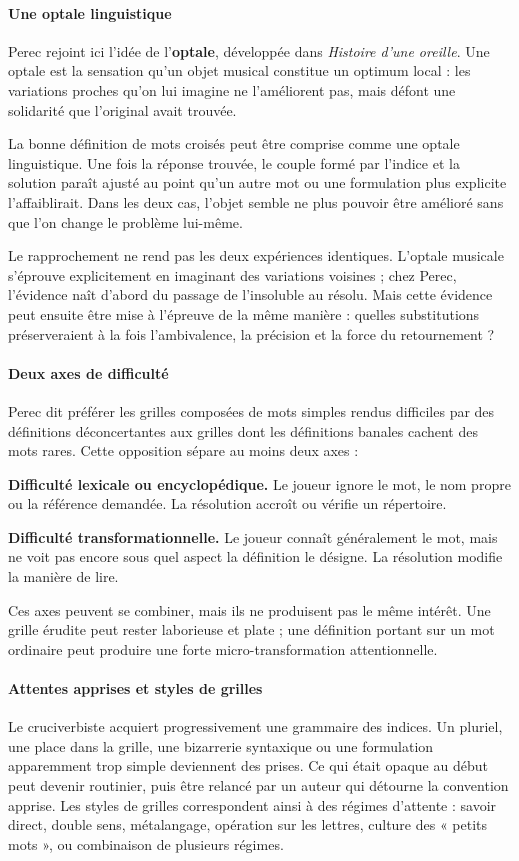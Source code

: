 \documentclass[10pt,a4paper]{article}
\begin{document}
\paragraph{Une optale linguistique}
Perec rejoint ici l'idée de l'\textbf{optale}, développée dans \emph{Histoire d'une oreille}. Une optale est la sensation qu'un objet musical constitue un optimum local : les variations proches qu'on lui imagine ne l'améliorent pas, mais défont une solidarité que l'original avait trouvée.

La bonne définition de mots croisés peut être comprise comme une optale linguistique. Une fois la réponse trouvée, le couple formé par l'indice et la solution paraît ajusté au point qu'un autre mot ou une formulation plus explicite l'affaiblirait. Dans les deux cas, l'objet semble ne plus pouvoir être amélioré sans que l'on change le problème lui-même.

Le rapprochement ne rend pas les deux expériences identiques. L'optale musicale s'éprouve explicitement en imaginant des variations voisines ; chez Perec, l'évidence naît d'abord du passage de l'insoluble au résolu. Mais cette évidence peut ensuite être mise à l'épreuve de la même manière : quelles substitutions préserveraient à la fois l'ambivalence, la précision et la force du retournement ?

\paragraph{Deux axes de difficulté}
Perec dit préférer les grilles composées de mots simples rendus difficiles par des définitions déconcertantes aux grilles dont les définitions banales cachent des mots rares. Cette opposition sépare au moins deux axes :

\textbf{Difficulté lexicale ou encyclopédique.} Le joueur ignore le mot, le nom propre ou la référence demandée. La résolution accroît ou vérifie un répertoire.

\textbf{Difficulté transformationnelle.} Le joueur connaît généralement le mot, mais ne voit pas encore sous quel aspect la définition le désigne. La résolution modifie la manière de lire.

Ces axes peuvent se combiner, mais ils ne produisent pas le même intérêt. Une grille érudite peut rester laborieuse et plate ; une définition portant sur un mot ordinaire peut produire une forte micro-transformation attentionnelle.

\paragraph{Attentes apprises et styles de grilles}
Le cruciverbiste acquiert progressivement une grammaire des indices. Un pluriel, une place dans la grille, une bizarrerie syntaxique ou une formulation apparemment trop simple deviennent des prises. Ce qui était opaque au début peut devenir routinier, puis être relancé par un auteur qui détourne la convention apprise. Les styles de grilles correspondent ainsi à des régimes d'attente : savoir direct, double sens, métalangage, opération sur les lettres, culture des « petits mots », ou combinaison de plusieurs régimes.
\end{document}
